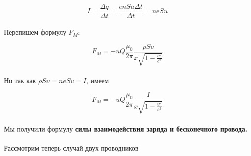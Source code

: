 \documentclass[dvipdfmx]{article}
\begin{document}
\paragraph{}

\begin{equation*}
  I = \frac{\Delta q}{\Delta t} = \frac{enSu\Delta t}{\Delta t} = neSu
\end{equation*}
\paragraph{}

Перепишем формулу $F_M$:

\begin{equation*}
  F_M = -uQ\frac{\mu_0}{2\pi}\frac{\rho S\upsilon}{x\sqrt{1-\frac{\upsilon^2}{c^2}}}
\end{equation*}
\paragraph{}

Но так как $\rho S\upsilon = neS\upsilon = I$, имеем

\begin{equation*}
  F_M = -uQ\frac{\mu_0}{2\pi}\frac{I}{x\sqrt{1-\frac{\upsilon^2}{c^2}}}
\end{equation*}
\paragraph{}

Мы получили формулу \textbf{силы взаимодействия заряда и бесконечного провода.}

\paragraph{}

Рассмотрим теперь случай двух проводников

\noindent{}
\end{document}
